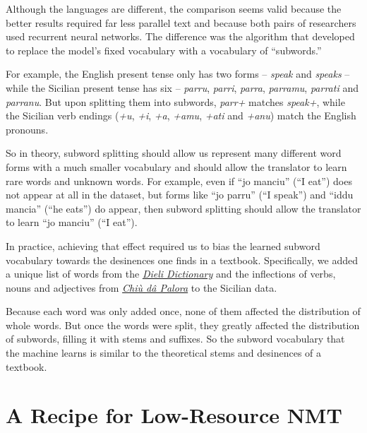 \documentclass[10pt,letterpaper]{article}
\begin{document}
Although the languages are different, the comparison seems valid because the better results required 
far less parallel text and because both pairs of researchers used recurrent neural networks.
The difference was the algorithm that \citet{sennrich2016subword}
developed to replace the model's fixed vocabulary with a vocabulary of ``subwords.''

For example, the English present tense only has two forms -- \textit{speak} and \textit{speaks} -- 
while the Sicilian present tense has six -- \textit{parru}, \textit{parri}, \textit{parra}, 
\textit{parramu}, \textit{parrati} and \textit{parranu}. 
But upon splitting them into subwords, \textit{parr+} matches \textit{speak+},
while the Sicilian verb endings
(\textit{+u}, \textit{+i}, \textit{+a}, \textit{+amu}, \textit{+ati} and \textit{+anu})
match the English pronouns.

So in theory, subword splitting should allow us represent many different word forms with a much smaller vocabulary
and should allow the translator to learn rare words and unknown words.
For example, even if ``jo manciu'' (``I eat'') does not appear at all in the dataset,
but forms like ``jo parru'' (``I speak'') and ``iddu mancia'' (``he eats'') do appear,
then subword splitting should allow the translator to learn ``jo manciu'' (``I eat'').

In practice, achieving that effect required us to bias the learned subword vocabulary towards
the desinences one finds in a textbook. Specifically, we added a unique list of words from the
\href{https://www.napizia.com/cgi-bin/sicilian.pl}{\textit{Dieli Dictionary}}
and the inflections of verbs, nouns and adjectives from
\href{https://www.napizia.com/cgi-bin/cchiu-da-palora.pl}{\textit{Chiù dâ Palora}}
to the Sicilian data.

Because each word was only added once, none of them affected the distribution of whole words.
But once the words were split, they greatly affected the distribution of subwords, filling it with stems and suffixes.
So the subword vocabulary that the machine learns is similar to the theoretical stems and desinences of a textbook.



\hypertarget{recipe}{}

\section*{A Recipe for Low-Resource NMT}
\end{document}
